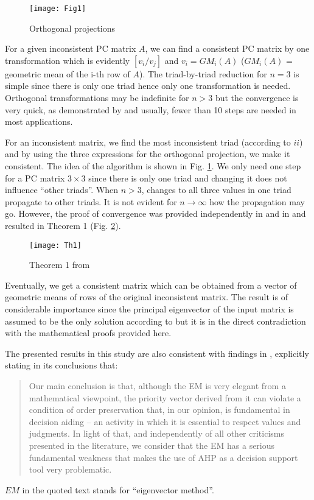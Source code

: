 \documentclass [12pt]{article}
\theoremstyle{definition}
\begin{document}
\begin{figure}[h]
\centering
\texttt{[image: Fig1]}
\caption[Orthogonal projections]{Orthogonal projections}
\label{fig:OrthogProj}
\end{figure}

For a given inconsistent PC matrix $A$, we can find a consistent PC matrix by one transformation which is evidently  $[v_i/v_j]$ and $v_i=GM_i(A)$ ($GM_i(A)$ = geometric mean of the i-th row of $A$). The triad-by-triad reduction for $n=3$ is simple since there is only one triad hence only one transformation is needed. Orthogonal transformations may be indefinite for $n>3$ but the convergence is very quick, as demonstrated by \cite{KKSX2015} and usually, fewer than 10 steps are needed in most applications.

For an inconsistent matrix, we find the most inconsistent triad (according to $ii$) and by using the three expressions for the orthogonal projection, we make it consistent. The idea of the algorithm is shown in Fig. \ref{fig:OrthogProj}. 
We only need one step for a PC matrix $3 \times 3$ since there is only one triad and changing it does not influence ``other triads''. When $n>3$, changes  to all three values in one triad propagate to other triads. It is not evident for $n\rightarrow \infty$ how the propagation may go. However, the proof of convergence was provided independently in \cite{BB1996} and in \cite{KS2010} and resulted in Theorem 1 (Fig. \ref{fig:Th1}).

\begin{figure}[h]
\centering
\texttt{[image: Th1]}
\caption[Theorem 1]{Theorem 1 from \cite{KS2010}}
\label{fig:Th1}
\end{figure}




Eventually, we get a consistent matrix which can be obtained from a vector of geometric means of rows of the original inconsistent matrix.
The result is of considerable importance since the principal eigenvector of the input matrix is assumed to be the only  solution according to \cite{Saaty77} but it is in the direct contradiction with the mathematical proofs provided here.

The presented results in this study are also consistent with findings in \cite{BV2004}, explicitly stating in its conclusions that:

\begin{quotation}
Our main conclusion
is that, although the EM is very elegant from
a mathematical viewpoint, the priority vector
derived from it can violate a condition of order preservation
that, in our opinion, is fundamental in
decision aiding -- an activity in which it is essential
to respect values and judgments. In light of that,
and independently of all other criticisms presented
in the literature, we consider that the EM has a serious
fundamental weakness that makes the use of
AHP as a decision support tool very problematic.
\end{quotation} $EM$ in the quoted text stands for ``eigenvector method''.
\end{document}
